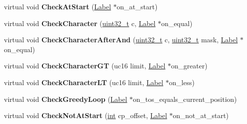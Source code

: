 \begin{DoxyCompactItemize}
virtual void {\bfseries Check\+At\+Start} (\mbox{\hyperlink{classv8_1_1internal_1_1Label}{Label}} $\ast$on\+\_\+at\+\_\+start)
\item 
\mbox{\label{classv8_1_1internal_1_1RegExpMacroAssemblerMIPS_a0139c180148c5b5ba2ddbd15bbeaa7f9}} 
virtual void {\bfseries Check\+Character} (\mbox{\hyperlink{classuint32__t}{uint32\+\_\+t}} c, \mbox{\hyperlink{classv8_1_1internal_1_1Label}{Label}} $\ast$on\+\_\+equal)
\item 
\mbox{\label{classv8_1_1internal_1_1RegExpMacroAssemblerMIPS_a384cf9c589f2b7346e84a5d35b359b95}} 
virtual void {\bfseries Check\+Character\+After\+And} (\mbox{\hyperlink{classuint32__t}{uint32\+\_\+t}} c, \mbox{\hyperlink{classuint32__t}{uint32\+\_\+t}} mask, \mbox{\hyperlink{classv8_1_1internal_1_1Label}{Label}} $\ast$on\+\_\+equal)
\item 
\mbox{\label{classv8_1_1internal_1_1RegExpMacroAssemblerMIPS_a8125957e75e4d4149e916f9a2e1fb925}} 
virtual void {\bfseries Check\+Character\+GT} (uc16 limit, \mbox{\hyperlink{classv8_1_1internal_1_1Label}{Label}} $\ast$on\+\_\+greater)
\item 
\mbox{\label{classv8_1_1internal_1_1RegExpMacroAssemblerMIPS_aeb4a8f3d2314494596589c9b1543faef}} 
virtual void {\bfseries Check\+Character\+LT} (uc16 limit, \mbox{\hyperlink{classv8_1_1internal_1_1Label}{Label}} $\ast$on\+\_\+less)
\item 
\mbox{\label{classv8_1_1internal_1_1RegExpMacroAssemblerMIPS_ae3b5ebd2bfaefa19786e18e5103b2881}} 
virtual void {\bfseries Check\+Greedy\+Loop} (\mbox{\hyperlink{classv8_1_1internal_1_1Label}{Label}} $\ast$on\+\_\+tos\+\_\+equals\+\_\+current\+\_\+position)
\item 
\mbox{\label{classv8_1_1internal_1_1RegExpMacroAssemblerMIPS_aca545a4b5e0b1b8cf0cc2fd6778eb8f1}} 
virtual void {\bfseries Check\+Not\+At\+Start} (\mbox{\hyperlink{classint}{int}} cp\+\_\+offset, \mbox{\hyperlink{classv8_1_1internal_1_1Label}{Label}} $\ast$on\+\_\+not\+\_\+at\+\_\+start)
\item 

\end{DoxyCompactItemize}
